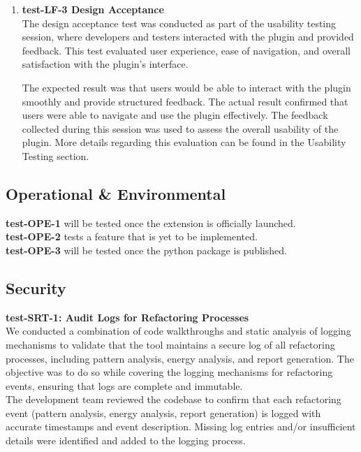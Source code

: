 \documentclass[12pt, titlepage]{article}
\begin{document}
\begin{enumerate}
  \item \textbf{test-LF-3 Design Acceptance} \\[2mm]
    The design acceptance test was conducted as part of the usability
    testing session, where developers and testers interacted with the
    plugin and provided feedback. This test evaluated user
    experience, ease of navigation, and overall satisfaction with the
    plugin’s interface.

    The expected result was that users would be able to interact with
    the plugin smoothly and provide structured feedback. The actual
    result confirmed that users were able to navigate and use the
    plugin effectively. The feedback collected during this session
    was used to assess the overall usability of the plugin. More
    details regarding this evaluation can be found in the Usability
    Testing section.

\end{enumerate}

\subsection{Operational \& Environmental}

\textbf{test-OPE-1} will be tested once the extension is officially
launched.\\[2mm]

\noindent
\textbf{test-OPE-2} tests a feature that is yet to be implemented. \\[2mm]

\noindent
\textbf{test-OPE-3} will be tested once the python package is published.

\subsection{Security}

\textbf{test-SRT-1: Audit Logs for Refactoring Processes} \\[2mm]
We conducted a combination of code walkthroughs and static analysis
of logging mechanisms to validate that the tool maintains a secure
log of all refactoring processes, including pattern analysis, energy
analysis, and report generation. The objective was to do so while
covering the logging mechanisms for refactoring events, ensuring that
logs are complete and immutable.\\

\noindent The development team reviewed the codebase to confirm that
each refactoring event (pattern analysis, energy analysis, report
generation) is logged with accurate timestamps and event description.
Missing log entries and/or insufficient details were identified and
added to the logging process.\\
\end{document}
